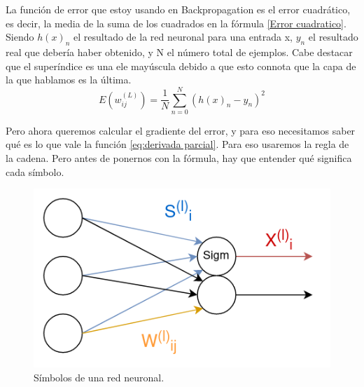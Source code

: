 La función de error que estoy usando en Backpropagation es el error cuadrático, es decir, la media de la suma de los cuadrados en la fórmula \ref{Error cuadratico}. Siendo $h(x)_n$ el resultado de la red neuronal para una entrada x, $y_n$ el resultado real que debería haber obtenido, y N el número total de ejemplos. Cabe destacar que el superíndice es una ele mayúscula debido a que esto connota que la capa de la que hablamos es la última.
\begin{equation}
	\label{Error cuadratico}
	E(w_{ij}^{(L)}) = \frac{1}{N}\sum_{n=0}^N(h(x)_n - y_n)^2
\end{equation}

Pero ahora queremos calcular el gradiente del error, y para eso necesitamos saber qué es lo que vale la función \ref{eq:derivada parcial}. Para eso usaremos la regla de la cadena. Pero antes de ponernos con la fórmula, hay que entender qué significa cada símbolo. 

\begin{figure}[h]
	\centering
	\includegraphics[width=15cm]{archivos/imagenes/Red-neuronal-simbolos.png}
	\caption{Símbolos de una red neuronal.}
	\label{fig:symb neural net}
\end{figure}

